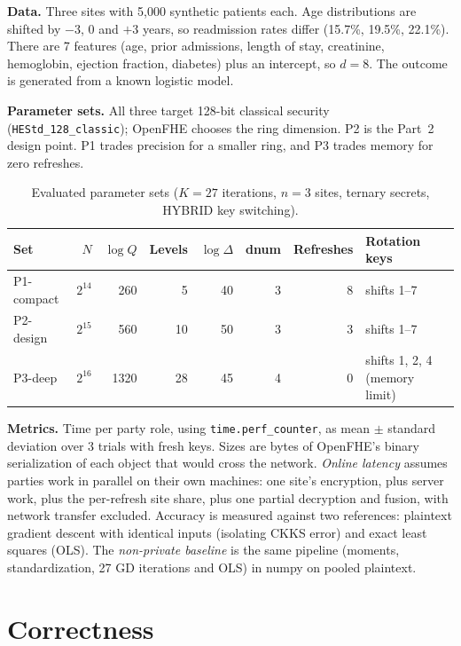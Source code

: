 \documentclass[11pt]{article}
\begin{document}
\textbf{Data.} Three sites with 5{,}000 synthetic patients each. Age distributions are shifted by $-3$, $0$ and $+3$ years, so readmission rates differ (15.7\%, 19.5\%, 22.1\%). There are 7 features (age, prior admissions, length of stay, creatinine, hemoglobin, ejection fraction, diabetes) plus an intercept, so $d=8$. The outcome is generated from a known logistic model.

\textbf{Parameter sets.} All three target 128-bit classical security (\texttt{HEStd\_128\_classic}); OpenFHE chooses the ring dimension. P2 is the Part~2 design point. P1 trades precision for a smaller ring, and P3 trades memory for zero refreshes.

\begin{table}[H]
\centering\small
\caption{Evaluated parameter sets ($K=27$ iterations, $n=3$ sites, ternary secrets, HYBRID key switching).}\label{tab:params}
\begin{tabularx}{\textwidth}{@{}lrrrrrrL@{}}
\toprule
\textbf{Set} & $N$ & $\log Q$ & \textbf{Levels} & $\log\Delta$ & \textbf{dnum} & \textbf{Refreshes} & \textbf{Rotation keys} \\
\midrule
P1-compact & $2^{14}$ & 260 & 5 & 40 & 3 & 8 & shifts 1--7 \\
P2-design  & $2^{15}$ & 560 & 10 & 50 & 3 & 3 & shifts 1--7 \\
P3-deep    & $2^{16}$ & 1320 & 28 & 45 & 4 & 0 & shifts 1, 2, 4 (memory limit) \\
\bottomrule
\end{tabularx}
\end{table}

\textbf{Metrics.} Time per party role, using \texttt{time.perf\_counter}, as mean $\pm$ standard deviation over 3 trials with fresh keys. Sizes are bytes of OpenFHE's binary serialization of each object that would cross the network. \emph{Online latency} assumes parties work in parallel on their own machines: one site's encryption, plus server work, plus the per-refresh site share, plus one partial decryption and fusion, with network transfer excluded. Accuracy is measured against two references: plaintext gradient descent with identical inputs (isolating CKKS error) and exact least squares (OLS). The \emph{non-private baseline} is the same pipeline (moments, standardization, 27 GD iterations and OLS) in numpy on pooled plaintext.

\section{Correctness}\label{sec:correct}
\end{document}
